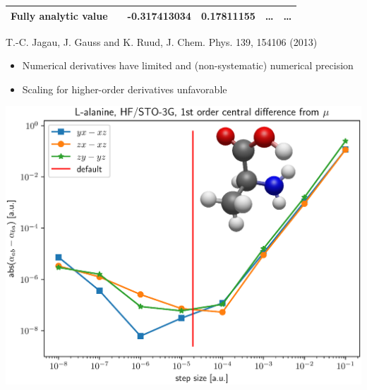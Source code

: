 \documentclass{beamer}
\begin{document}
\begin{frame}
\begin{table}
\begin{tabular}{llllll}
      Fully analytic value & & -0.317413034 & 0.17811155 & \dots & \dots \\
      \bottomrule
    \end{tabular}
    T.-C. Jagau, J. Gauss and K. Ruud, J. Chem. Phys. 139, 154106 (2013)
  \end{table}
  \begin{itemize}
  \item Numerical derivatives have limited and (non-systematic) numerical precision
  \item Scaling for higher-order derivatives unfavorable
  \end{itemize}
\end{frame}

\begin{frame}
  \centering
  \includegraphics[width=\linewidth,keepaspectratio]{../diff_overlay.eps}
\end{frame}
\end{document}
